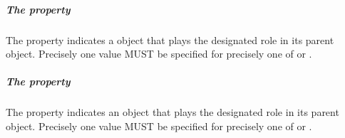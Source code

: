 \subparagraph{The  property}\label{sec:participant}

The  property indicates a  object that plays the designated role in its parent  object.
%
Precisely one value MUST be specified for precisely one of   or .

\subparagraph{The  property}\label{sec:higherOrderParticipant}

The  property indicates an  object that plays the designated role in its parent  object.
%
Precisely one value MUST be specified for precisely one of   or .

